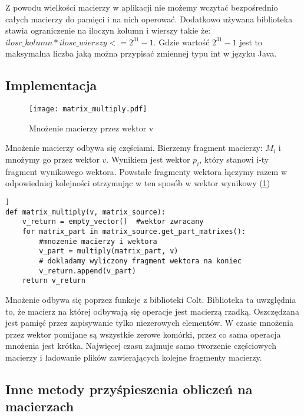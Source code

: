 Z powodu wielkości macierzy w aplikacji nie możemy wczytać bezpośrednio całych macierzy do pamięci i na nich operować. Dodatkowo używana biblioteka stawia ograniczenie na iloczyn kolumn i wierszy takie że: $ilosc\_kolumn * ilosc\_wierszy <= 2^{31}-1$.  Gdzie wartość $2^{31}-1$ jest to maksymalna liczba jaką można przypisać zmiennej typu int w języku Java. 



\subsection*{Implementacja}

\begin{figure}[htb]
\centering
\texttt{[image: matrix\_multiply.pdf]}
\caption{Mnożenie macierzy przez wektor v}
\label{fig:matrix_mult_fig}
\end{figure}

Mnożenie macierzy odbywa się częściami. Bierzemy fragment macierzy: $M_{i}$ i mnożymy go przez wektor $v$. Wynikiem jest wektor $p_i$, który stanowi i-ty fragment wynikowego wektora. Powstałe fragmenty wektora łączymy razem w odpowiedniej kolejności otrzymując w ten sposób w wektor wynikowy (\ref{fig:matrix_mult_fig})




\lstset{language=Python}
\begin{lstlisting}[frame=lines, caption={Mnożenie macierzy przez wektor v}, label={list:matrix_mult_fig}] ]
def matrix_multiply(v, matrix_source):
	v_return = empty_vector()  #wektor zwracany
	for matrix_part in matrix_source.get_part_matrixes():
		#mnozenie macierzy i wektora
		v_part = multiply(matrix_part, v) 
		# dokladamy wyliczony fragment wektora na koniec
		v_return.append(v_part)   
	return v_return 
\end{lstlisting}

Mnożenie odbywa się poprzez funkcje z biblioteki Colt. Biblioteka ta uwzględnia to, że macierz na której odbywają się operacje jest macierzą rzadką. Oszczędzana jest pamięć przez zapisywanie tylko niezerowych elementów. W czasie mnożenia przez wektor pomijane są wszystkie zerowe komórki, przez co sama operacja mnożenia jest krótka. Najwięcej czasu zajmuje samo tworzenie częściowych  macierzy i ładowanie plików zawierających kolejne fragmenty macierzy. 


\subsection{Inne metody przyśpieszenia obliczeń na macierzach}

